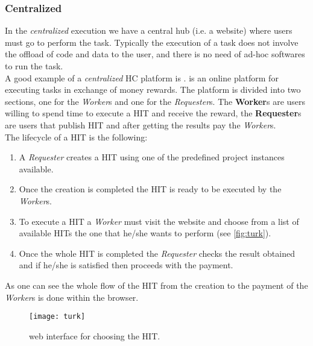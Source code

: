 \subsubsection{Centralized}
In the \emph{centralized} execution we have a central hub (i.e. a website) where
users must go to perform the task. Typically the execution of a task does not
involve the offload of code and data to the user, and there is no need of ad-hoc
softwares to run the task.\\

A good example of a \emph{centralized} \ac{HC} platform is .
 is an online platform for executing tasks in exchange of money
rewards. The platform is divided into two sections, one for the \emph{Worker}s and
one for the \emph{Requester}s. The \textbf{Worker}s are users willing to spend
time to execute a \ac{HIT} and receive the reward, the \textbf{Requester}s are
users that publish \ac{HIT} and after getting the results pay the \emph{Worker}s.\\

The lifecycle of a \ac{HIT} is the following:
\begin{enumerate}
    \item A \emph{Requester} creates a \ac{HIT} using one of the predefined project
    instances available.

    \item Once the creation is completed the \ac{HIT} is ready to be executed by
    the \emph{Worker}s.

    \item To execute a \ac{HIT} a \emph{Worker} must visit the 
    website and choose from a list of available \ac{HIT}s the one that he/she
    wants to perform (see \autoref{fig:turk}).

    \item Once the whole \ac{HIT} is completed the \emph{Requester} checks the
    result obtained and if he/she is satisfied then proceeds with the payment.
\end{enumerate}
As one can see the whole flow of the \ac{HIT} from the creation to the payment
of the \emph{Worker}s is done within the browser.\\
\begin{figure}[htb]
    \centering
    \texttt{[image: turk]}
    \caption{ web interface for choosing the \acs{HIT}.}
    \label{fig:turk}
\end{figure}


